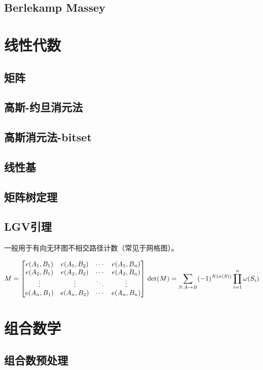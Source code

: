 \documentclass{article}
\begin{document}
\subsection{Berlekamp Massey}


\section{线性代数}
\subsection{矩阵}
\subsection{高斯-约旦消元法}

\subsection{高斯消元法-bitset}

\subsection{线性基}

\subsection{矩阵树定理}

\subsection{LGV引理}
一般用于有向无环图不相交路径计数（常见于网格图）。

$$
M = \begin{bmatrix}e(A_1,B_1)&e(A_1,B_2)&\cdots&e(A_1,B_n)\\ 
e(A_2,B_1)&e(A_2,B_2)&\cdots&e(A_2,B_n)\\ 
\vdots&\vdots&\ddots&\vdots\\ 
e(A_n,B_1)&e(A_n,B_2)&\cdots&e(A_n,B_n)\end{bmatrix}\\ 
\det(M)=\sum\limits_{S:A\rightarrow B}(-1)^{N(\sigma(S))}\prod\limits_{i=1}^n \omega(S_i)
$$

\section{组合数学}
\subsection{组合数预处理}

\end{document}
